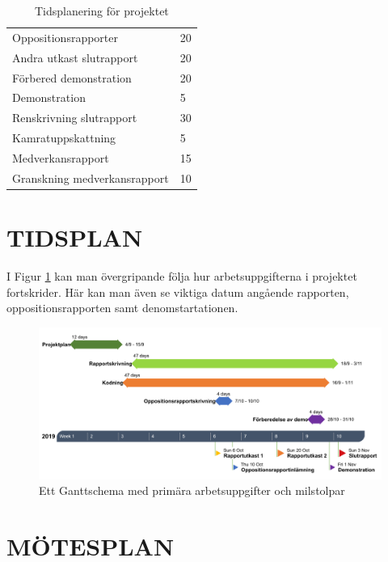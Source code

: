 \documentclass[a4paper]{article}
\begin{document}
\begin{table}[b]
\begin{tabular}{|l|l|}
Oppositionsrapporter                                      & 20               \\
Andra utkast slutrapport                                  & 20               \\
Förbered demonstration                                    & 20               \\
Demonstration                                             & 5               \\
Renskrivning slutrapport                                  & 30               \\
Kamratuppskattning                                        & 5                \\
Medverkansrapport                                         & 15               \\
Granskning medverkansrapport                              & 10               \\ \hline
\end{tabular}
\caption{Tidsplanering för projektet}
\label{tab:aktiviteter}
\end{table}

\section{TIDSPLAN}
\label{sec:tidsplan}

I Figur \ref{fig:Gantt} kan man övergripande följa hur arbetsuppgifterna i projektet fortskrider. Här kan man även se viktiga datum angående rapporten, oppositionsrapporten samt denomstartationen.

\begin{figure}[!ht]
	\includegraphics[width=1\textwidth]{figurer/Gantt.png}
	\caption{Ett Ganttschema med primära arbetsuppgifter och milstolpar}
	\label{fig:Gantt}
\end{figure}

\section{MÖTESPLAN}
\label{sec:mötesplan}
\end{document}
